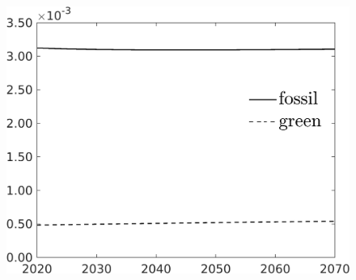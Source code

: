 \begin{figure}[h!!]
\begin{minipage}[]{0.32\textwidth}
		\includegraphics[width=1\textwidth]{../../codding_model/own_basedOnFried/optimalPol_190722_tidiedUp/figures/all_Aout22/SingleJointTOT_regime3_OPT_NOT_NoTaus_LabourInp_spillover0_noskill0_sep1_xgrowth0_extern0_PV1_etaa0.79_lgd1.png}
	\end{minipage}
\end{figure} 

